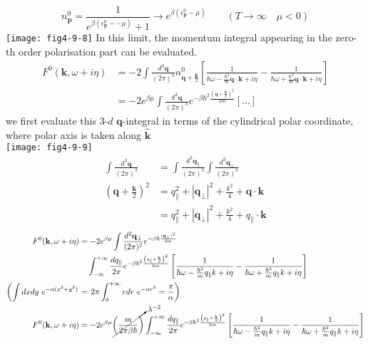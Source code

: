 \[
n^0_{\mathbf p}=\frac{1}{e^{\beta(\epsilon^0_{\mathbf p}--\mu)}+1}\to e^{\beta(\epsilon^0_{\mathbf p}-\mu)} \qquad (T\to \infty\quad \mu<0)
\]
\texttt{[image: fig4-9-8]}
 In this limit, the momentum integral appearing in the zero-th order polarisation part can be evaluated.
\begin{equation}
\begin{aligned}
F^0(\mathbf k,\omega+i\eta)&=-2\int \frac{d^3\mathbf q}{(2\pi)^3} n^0_{\mathbf q+\frac{\mathbf k}{2}} \left[ \frac{1}{\hbar \omega-\frac{\hbar^2}{m} \mathbf q\cdot\mathbf k+i\eta}-\frac{1}{\hbar \omega+\frac{\hbar^2}{m} \mathbf q\cdot\mathbf k+i\eta} \right]\\
&=-2e^{\beta\mu} \int \frac{d^3\mathbf q}{(2\pi)^3}e^{-\beta\hbar^2 \frac{\left(\mathbf q+\frac{\mathbf k}{2}\right)^2}{2m}}[...]
\end{aligned}
\end{equation}
we first evaluate this $3$-$d$ $\mathbf q$-integral in terms of the cylindrical polar coordinate, where polar axis is taken along $\hat{\mathbf k}$\\
\texttt{[image: fig4-9-9]}\\
\[
\begin{aligned}
\int \frac{d^3\mathbf q}{(2\pi)^3}&=\int \frac{d^3\mathbf q_\parallel}{(2\pi)^3} \int \frac{d^3\mathbf q_\perp}{(2\pi)^3}\\
\left(\mathbf q+\frac{\mathbf k}{2}\right)^2&=q_\parallel^2+|\mathbf q_\perp|^2+\frac{k^2}{4}+\mathbf q\cdot\mathbf k\\
&=q_\parallel^2+|\mathbf q_\perp|^2+\frac{k^2}{4}+q_\parallel\cdot\mathbf k
\end{aligned}
\]
\[
\begin{aligned}
F^0(\mathbf k,\omega+i\eta)&=-2e^{\beta\mu} \int \frac{d^2\mathbf q_\perp}{(2\pi)^2}e^{-\beta\hbar\frac{|\mathbf q_\perp|^2}{2m}}\\
&\quad \int_{-\infty}^{+\infty} \frac{d q_\parallel}{2\pi} e^{-\beta\hbar^2 \frac{\left(q_\parallel+\frac{ k}{2}\right)^2}{2m}}
\left[ \frac{1}{\hbar \omega-\frac{\hbar^2}{m} q_\parallel k+i\eta}-\frac{1}{\hbar \omega+\frac{\hbar^2}{m}  q_\parallel  k+i\eta} \right]\\
\left( \int dxdy\ e^{-\alpha(x^2+y^2)}\right. &=\left.2\pi \int_0^{+\infty} rdr\ e^{-\alpha r^2}=\frac{\pi}{\alpha} \right)\\
F^0(\mathbf k,\omega+i\eta)&=-2e^{\beta\mu} \cancelto{\lambda^{-2}}{\left( \frac{m}{2\pi\beta\hbar} \right)} \int_{-\infty}^{+\infty} \frac{d q_\parallel}{2\pi} e^{-\beta\hbar^2 \frac{\left(q_\parallel+\frac{ k}{2}\right)^2}{2m}}
\left[ \frac{1}{\hbar \omega-\frac{\hbar^2}{m} q_\parallel  k+i\eta}-\frac{1}{\hbar \omega+\frac{\hbar^2}{m}  q_\parallel  k+i\eta} \right]
\end{aligned}
\]

